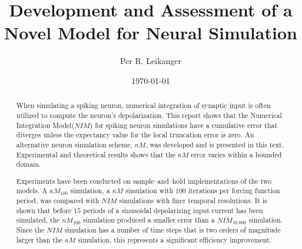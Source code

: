 \documentclass[b5paper,12 pt]{report}
\author{Per R. Leikanger}
\title{Development and Assessment of a Novel Model for Neural Simulation}
\date{\today}
\begin{document}
   





\maketitle

\begin{abstract}
When simulating a spiking neuron, numerical integration of synaptic input is often utilized to compute the neuron's depolarization.
This report shows that the Numerical Integration Model($NIM$) for spiking neuron simulations have a cumulative error that diverges unless the expectancy value for the local truncation error is zero.
An alternative neuron simulation scheme, $\kappa M$, was developed and is presented in this text.
Experimental and theoretical results shows that the $\kappa M$ error varies within a bounded domain.

Experiments have been conducted on sample--and--hold implementations of the two models.
A $\kappa M_{100}$ simulation, a $\kappa M$ simulation with $100$ iterations per forcing function period, was compared with $NIM$ simulations with finer temporal resolutions.
It is shown that before $15$ periods of a sinusoidal depolarizing input current has been simulated, the $\kappa M_{100}$ simulation produced a smaller error than a $NIM_{10.000}$ simulation.
Since the $NIM$ simulation has a number of time steps that is two orders of magnitude larger than the $\kappa M$ simulation, this represents a significant efficiency improvement.


\end{abstract}
\end{document}
